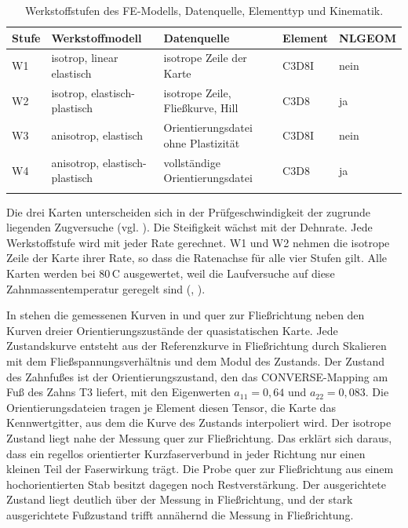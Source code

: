 \begin{table}[htbp]
	\caption{Werkstoffstufen des FE-Modells, Datenquelle, Elementtyp und Kinematik.}
	\label{tab:werkstoffstufen}
	\centering
	\small
	\begin{tabular}{lL{4.2cm}L{4.8cm}ll}
		\hline
		Stufe & Werkstoffmodell                & Datenquelle                         & Element & NLGEOM \\
		\hline
		W1    & isotrop, linear elastisch      & isotrope Zeile der Karte            & C3D8I   & nein   \\
		\hline
		W2    & isotrop, elastisch-plastisch   & isotrope Zeile, Fließkurve, Hill    & C3D8    & ja     \\
		\hline
		W3    & anisotrop, elastisch           & Orientierungsdatei ohne Plastizität & C3D8I   & nein   \\
		\hline
		W4    & anisotrop, elastisch-plastisch & vollständige Orientierungsdatei     & C3D8    & ja     \\
		\hline
	\end{tabular}
\end{table}

Die drei Karten unterscheiden sich in der Prüfgeschwindigkeit der zugrunde liegenden Zugversuche (vgl. ). Die Steifigkeit wächst mit der Dehnrate. Jede Werkstoffstufe wird mit jeder Rate gerechnet. W1 und W2 nehmen die isotrope Zeile der Karte ihrer Rate, so dass die Ratenachse für alle vier Stufen gilt. Alle Karten werden bei $80$\,\textdegree C ausgewertet, weil die Laufversuche auf diese Zahnmassentemperatur geregelt sind (, ).

In  stehen die gemessenen Kurven in und quer zur Fließrichtung neben den Kurven dreier Orientierungszustände der quasistatischen Karte. Jede Zustandskurve entsteht aus der Referenzkurve in Fließrichtung durch Skalieren mit dem Fließspannungsverhältnis und dem Modul des Zustands. Der Zustand des Zahnfußes ist der Orientierungszustand, den das CONVERSE-Mapping am Fuß des Zahns T3 liefert, mit den Eigenwerten $a_{11} = 0{,}64$ und $a_{22} = 0{,}083$. Die Orientierungsdateien tragen je Element diesen Tensor, die Karte das Kennwertgitter, aus dem die Kurve des Zustands interpoliert wird. Der isotrope Zustand liegt nahe der Messung quer zur Fließrichtung. Das erklärt sich daraus, dass ein regellos orientierter Kurzfaserverbund in jeder Richtung nur einen kleinen Teil der Faserwirkung trägt. Die Probe quer zur Fließrichtung aus einem hochorientierten Stab besitzt dagegen noch Restverstärkung. Der ausgerichtete Zustand liegt deutlich über der Messung in Fließrichtung, und der stark ausgerichtete Fußzustand trifft annähernd die Messung in Fließrichtung.


